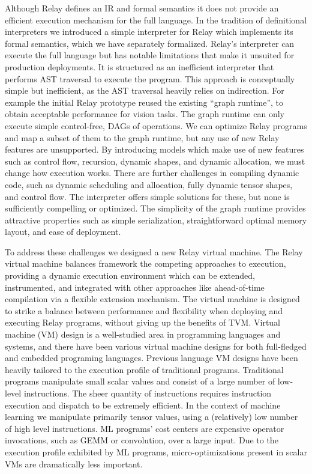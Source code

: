 Although Relay defines an IR and formal semantics
  it does not provide an efficient execution mechanism for the full language.
In the tradition of definitional interpreters we introduced
  a simple interpreter for Relay which implements its formal semantics, which
  we have separately formalized.
Relay’s interpreter can execute the full language but has notable limitations
  that make it unsuited for production deployments.
It is structured as an inefficient interpreter that performs AST traversal to execute the program.
This approach is conceptually simple but inefficient, as the AST traversal heavily relies on indirection.
For example the initial Relay prototype reused the existing ``graph runtime'', to obtain
  acceptable performance for vision tasks.
The graph runtime can only execute simple control-free,
  DAGs of operations.
We can optimize Relay programs and map a subset of them
  to the graph runtime, but any use of new Relay features
  are unsupported.
By introducing models which make use of new features such
  as control flow, recursion, dynamic shapes, and dynamic allocation,
  we must change how execution works.
There are further challenges in compiling dynamic code, such as dynamic scheduling and allocation,
  fully dynamic tensor shapes, and control flow.
The interpreter offers simple solutions for these, but none is sufficiently compelling or optimized.
The simplicity of the graph runtime provides attractive
  properties such as simple serialization, straightforward
  optimal memory layout, and ease of deployment.

To address these challenges we designed a new Relay
  virtual machine.
The Relay virtual machine balances framework the competing approaches to execution,
  providing a dynamic execution environment which can be extended, instrumented, and integrated with other approaches
  like ahead-of-time compilation via a flexible extension mechanism.
The virtual machine is designed to strike a balance between performance and flexibility
  when deploying and executing Relay programs, without giving up the benefits of TVM.
Virtual machine (VM) design is a well-studied area in programming languages and systems,
  and there have been various virtual machine designs for both full-fledged and embedded programing languages.
Previous language VM designs have been heavily tailored to the execution profile of traditional programs.
Traditional programs manipulate small scalar values
  and consist of a large number of low-level instructions.
The sheer quantity of instructions requires instruction execution
  and dispatch to be extremely efficient.
In the context of machine learning we manipulate primarily tensor values,
  using a (relatively) low number of high level instructions.
ML programs’ cost centers are expensive operator invocations,
  such as GEMM or convolution, over a large input.
Due to the execution profile exhibited by ML programs,
  micro-optimizations present in scalar VMs are dramatically less important.

